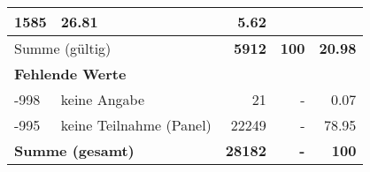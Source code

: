 \begin{longtable}{lXrrr}
       \num{1585} &
       \num[round-mode=places,round-precision=2]{26,81} &
         \num[round-mode=places,round-precision=2]{5,62} \\
     \midrule
     \multicolumn{2}{l}{Summe (gültig)} &
       \textbf{\num{5912}} &
     \textbf{100} &
       \textbf{\num[round-mode=places,round-precision=2]{20,98}} \\
     \multicolumn{5}{l}{\textbf{Fehlende Werte}}\\
       -998 &
       keine Angabe &
         \num{21} &
        - &
         \num[round-mode=places,round-precision=2]{0,07} \\
       -995 &
       keine Teilnahme (Panel) &
         \num{22249} &
        - &
         \num[round-mode=places,round-precision=2]{78,95} \\
     \midrule
     \multicolumn{2}{l}{\textbf{Summe (gesamt)}} &
          \textbf{\num{28182}} &
        \textbf{-} &
        \textbf{100} \\
     \bottomrule
     \end{longtable}
     
